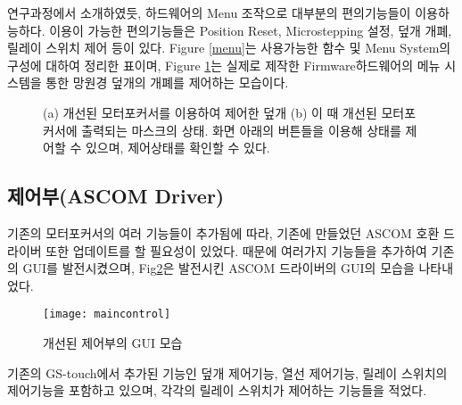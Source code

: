 연구과정에서 소개하였듯, 하드웨어의 Menu 조작으로 대부분의 편의기능들이 이용하능하다. 이용이 가능한 편의기능들은 Position Reset, Microstepping 설정, 덮개 개폐, 릴레이 스위치 제어 등이 있다. \textrm{Figure} \ref{menu}는 사용가능한 함수 및 Menu System의 구성에 대하여 정리한 표이며, \textrm{Figure} \ref{mask_status}는 실제로 제작한 Firmware하드웨어의 메뉴 시스템을 통한 망원경 덮개의 개폐를 제어하는 모습이다.

	\begin{figure}[ht]
	\begin{center}
	\end{center}
	\caption{(a) 개선된 모터포커서를 이용하여 제어한 덮개 (b) 이 때 개선된 모터포커서에 출력되는 마스크의 상태. 화면 아래의 버튼들을 이용해 상태를 제어할 수 있으며, 제어상태를 확인할 수 있다.}
	\label{mask_status}
\end{figure}
 
\newpage

\subsection{제어부(ASCOM Driver)}


 기존의 모터포커서의 여러 기능들이 추가됨에 따라, 기존에 만들었던 ASCOM 호환 드라이버 또한 업데이트를 할 필요성이 있었다. 때문에 여러가지 기능들을 추가하여 기존의 GUI를 발전시켰으며, Fig\ref{maincontrol}은 발전시킨 ASCOM 드라이버의 GUI의 모습을 나타내었다.
 
 \begin{figure}[h]
	\begin{center}
		\texttt{[image: maincontrol]}
	\end{center}
	\caption{개선된 제어부의 GUI 모습}
	\label{maincontrol}
\end{figure}

 기존의 GS-touch에서 추가된 기능인 덮개 제어기능, 열선 제어기능, 릴레이 스위치의 제어기능을 포함하고 있으며, 각각의 릴레이 스위치가 제어하는 기능들을 적었다.
